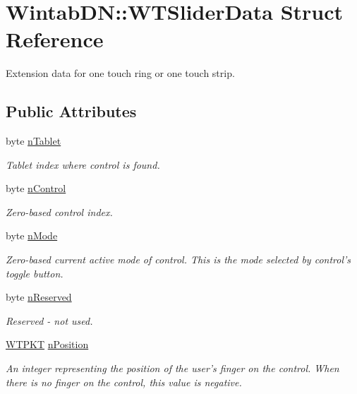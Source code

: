 \hypertarget{struct_wintab_d_n_1_1_w_t_slider_data}{
\section{WintabDN::WTSliderData Struct Reference}
\label{struct_wintab_d_n_1_1_w_t_slider_data}
}


Extension data for one touch ring or one touch strip.  


\subsection*{Public Attributes}
\begin{DoxyCompactItemize}
\item 
byte \hyperlink{struct_wintab_d_n_1_1_w_t_slider_data_ad7d873006c2202ed8cf64372156480e5}{nTablet}
\begin{DoxyCompactList}\small\item\em Tablet index where control is found. \item\end{DoxyCompactList}\item 
byte \hyperlink{struct_wintab_d_n_1_1_w_t_slider_data_a6e9b0e2000225460c886bcd723ae2513}{nControl}
\begin{DoxyCompactList}\small\item\em Zero-\/based control index. \item\end{DoxyCompactList}\item 
byte \hyperlink{struct_wintab_d_n_1_1_w_t_slider_data_ae53b13eec56536783d9ce573edb39ceb}{nMode}
\begin{DoxyCompactList}\small\item\em Zero-\/based current active mode of control. This is the mode selected by control's toggle button. \item\end{DoxyCompactList}\item 
byte \hyperlink{struct_wintab_d_n_1_1_w_t_slider_data_a583272c2d4a1a737305fc47ba02b31c1}{nReserved}
\begin{DoxyCompactList}\small\item\em Reserved -\/ not used. \item\end{DoxyCompactList}\item 
\hyperlink{class_wintab_d_n_1_1_w_t_p_k_t}{WTPKT} \hyperlink{struct_wintab_d_n_1_1_w_t_slider_data_a3dd27592829cec27d5e117a192a0747a}{nPosition}
\begin{DoxyCompactList}\small\item\em An integer representing the position of the user's finger on the control. When there is no finger on the control, this value is negative. \item\end{DoxyCompactList}\end{DoxyCompactItemize}


